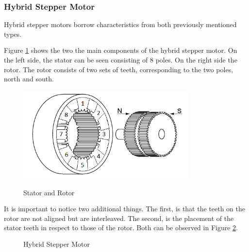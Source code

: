 \newpage
\subsubsection{Hybrid Stepper Motor}
Hybrid stepper motors borrow characteristics from both previously mentioned types.

Figure \ref{fig:hybrid_components} shows the two the main components of the hybrid stepper motor. 
On the left side, the stator can be seen consisting of 8 poles. On the right side the rotor. The 
rotor consists of two sets of teeth, corresponding to the two poles, north and south.
\begin{figure}[h]
	\centering
	\includegraphics[width=0.8\textwidth]{figures/move/motor27.png}
	\caption{Stator and Rotor} \cite{Instructables}
	\label{fig:hybrid_components}
\end{figure}

It is important to notice two additional things. The first, is that the teeth on the rotor are not 
aligned but are interleaved. The second, is the placement of the stator teeth in respect to those 
of the rotor. Both can be observed in Figure \ref{fig:stepper}.

\begin{figure}[htp]
    \centering%
    \hfill
    \caption{Hybrid Stepper Motor}\cite{Embedded}
    \label{fig:stepper}
\end{figure}

